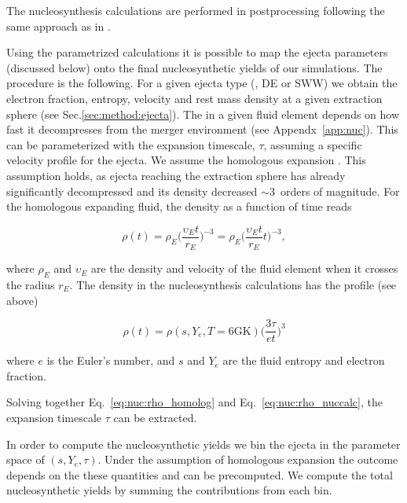 The nucleosynthesis calculations are performed in postprocessing
following the same approach as in \cite{Radice:2016dwd,Radice:2018pdn}.

Using the parametrized \rproc{} calculations it is possible to map the ejecta 
parameters (discussed below) onto the final nucleosynthetic yields of our simulations.
The procedure is the following. 
For a given ejecta type (\eg, \ac{DE} or \ac{SWW}) we obtain the electron fraction,
entropy, velocity and rest mass density at a given extraction sphere 
(see Sec.\ref{sec:method:ejecta}).
The \rproc{} in a given fluid element depends on how fast it decompresses from the 
merger environment (see Appendx~\ref{app:nuc}). 
This can be parameterized with the expansion timescale, $\tau$, assuming a specific 
velocity profile for the ejecta. We assume the homologous expansion .
This assumption holds, as ejecta reaching the extraction sphere has already 
significantly decompressed and its density decreased ${\sim}3$~orders of magnitude. 
For the homologous expanding fluid, the density as a function of time reads 

\begin{equation}
\rho(t) = \rho_E\Big(\frac{\upsilon_E t}{r_E}\Big)^{-3} = 
\rho_E\Big(\frac{\upsilon_E t}{r_E}t\Big)^{-3},
\label{eq:nuc:rho_homolog}
\end{equation}

where $\rho_E$ and $\upsilon_E$ are the density and velocity of the fluid element 
when it crosses the radius $r_E$. 
The density in the nucleosynthesis calculations has the profile (see above) 

\begin{equation}
\rho(t) = \rho(s, Y_e, T=6\text{GK})\Big(\frac{3\tau}{e t}\Big)^3
\label{eq:nuc:rho_nuccalc}
\end{equation}

where $e$ is the Euler's number, and $s$ and $Y_e$ are the fluid entropy and 
electron fraction.

Solving together Eq.~\eqref{eq:nuc:rho_homolog} and Eq.~\eqref{eq:nuc:rho_nuccalc},
the expansion timescale $\tau$ can be extracted.

In order to compute the nucleosynthetic yields we bin the ejecta in the 
parameter space of $(s, Y_e, \tau)$. 
Under the assumption of homologous expansion the \rproc{} outcome depends on 
the these quantities and can be precomputed.
We compute the total nucleosynthetic yields by summing the contributions from 
each bin.


